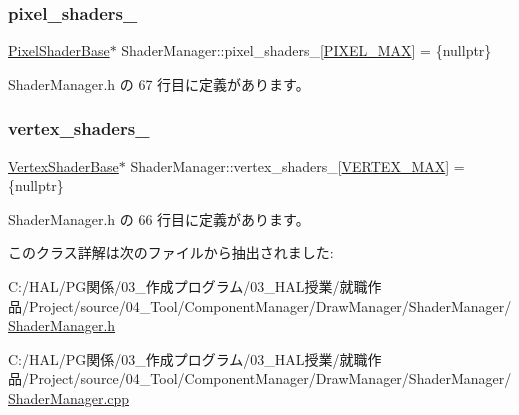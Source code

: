 \subsubsection{\texorpdfstring{pixel\+\_\+shaders\+\_\+}{pixel\_shaders\_}}
{\footnotesize\ttfamily \mbox{\hyperlink{class_pixel_shader_base}{Pixel\+Shader\+Base}}$\ast$ Shader\+Manager\+::pixel\+\_\+shaders\+\_\+\mbox{[}\mbox{\hyperlink{class_shader_manager_a7d15d773b3c6a99dd7086c45c8b0be5fa9281ee100f356fae9f9432679705bb9e}{P\+I\+X\+E\+L\+\_\+\+M\+AX}}\mbox{]} = \{nullptr\}\hspace{0.3cm}{\ttfamily [private]}}



 Shader\+Manager.\+h の 67 行目に定義があります。

\mbox{\label{class_shader_manager_a56ae173a708111646ae72973f623b036}} 
\subsubsection{\texorpdfstring{vertex\+\_\+shaders\+\_\+}{vertex\_shaders\_}}
{\footnotesize\ttfamily \mbox{\hyperlink{class_vertex_shader_base}{Vertex\+Shader\+Base}}$\ast$ Shader\+Manager\+::vertex\+\_\+shaders\+\_\+\mbox{[}\mbox{\hyperlink{class_shader_manager_a9b51e49d70eb3cc58f6d1f3994e8cfbda2a90d8502c5060ffb7b4a7d1c1f0e940}{V\+E\+R\+T\+E\+X\+\_\+\+M\+AX}}\mbox{]} = \{nullptr\}\hspace{0.3cm}{\ttfamily [private]}}



 Shader\+Manager.\+h の 66 行目に定義があります。



このクラス詳解は次のファイルから抽出されました\+:\begin{DoxyCompactItemize}
\item 
C\+:/\+H\+A\+L/\+P\+G関係/03\+\_\+作成プログラム/03\+\_\+\+H\+A\+L授業/就職作品/\+Project/source/04\+\_\+\+Tool/\+Component\+Manager/\+Draw\+Manager/\+Shader\+Manager/\mbox{\hyperlink{_shader_manager_8h}{Shader\+Manager.\+h}}\item 
C\+:/\+H\+A\+L/\+P\+G関係/03\+\_\+作成プログラム/03\+\_\+\+H\+A\+L授業/就職作品/\+Project/source/04\+\_\+\+Tool/\+Component\+Manager/\+Draw\+Manager/\+Shader\+Manager/\mbox{\hyperlink{_shader_manager_8cpp}{Shader\+Manager.\+cpp}}\end{DoxyCompactItemize}
